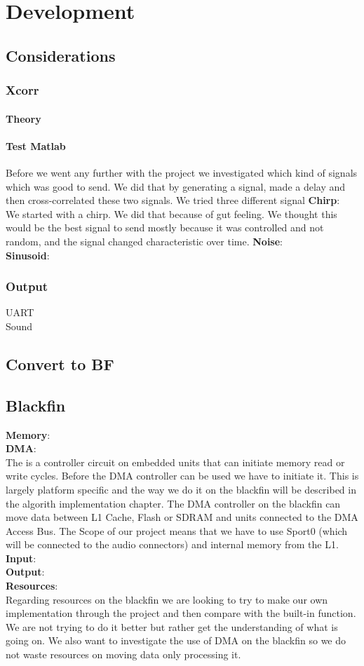 \chapter{Development}
\section{Considerations}
\subsection{Xcorr}
\subsubsection{Theory}
\subsubsection{Test Matlab}
Before we went any further with the project we investigated which kind of signals which was good to send. We did that by generating a signal, made a delay and then cross-correlated these two signals.
We tried three different signal
\textbf{Chirp}:\\
We started with a chirp. We did that because of gut feeling. We thought this would be the best signal to send mostly because it was controlled and not random, and the signal changed characteristic over time.
\textbf{Noise}:\\
\textbf{Sinusoid}:\\
\subsection{Output}
UART\\
Sound\\
\section{Convert to BF}
\section{Blackfin}
\textbf{Memory}:\\
\textbf{DMA}:\\
The is a controller circuit on embedded units that can initiate memory read or write cycles. Before the DMA controller can be used we have to initiate it. This is largely platform specific and the way we do it on the blackfin will be described in the algorith implementation chapter. The DMA controller on the blackfin can move data between L1 Cache, Flash or SDRAM and units connected to the DMA Access Bus. The Scope of our project means that we have to use Sport0 (which will be connected to the audio connectors) and internal memory from the L1. 
\textbf{Input}:\\
\textbf{Output}:\\
\textbf{Resources}:\\
Regarding resources on the blackfin we are looking to try to make our own implementation through the project and then compare with the built-in function. We are not trying to do it better but rather get the understanding of what is going on.
We also want to investigate the use of DMA on the blackfin so we do not waste resources on moving data only processing it.
